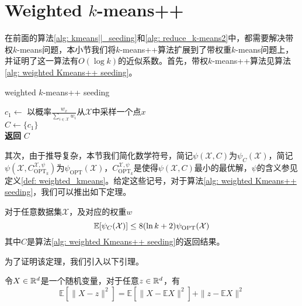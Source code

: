 \section{Weighted \texorpdfstring{$k$}{k}-means++}
在前面的算法\ref{alg: kmeans||_seeding}和\ref{alg: reduce_k-means2}中，都需要解决带权$k$-means问题，本小节我们将$k$-means++算法扩展到了带权重$k$-means问题上，并证明了这一算法有$O(\log k)$的近似系数。首先，带权$k$-means++算法见算法\ref{alg: weighted Kmeans++ seeding}。
\begin{algorithm}
    \caption{weighted $k$-means++ seeding}\label{alg: weighted Kmeans++ seeding}
    $c_1 \gets $ 以概率$\frac{w_x}{\sum_{i \in \mathcal{X}} w_i}$从$\mathcal{X}$中采样一个点$x$ \\
    $C \gets \{c_1\}$ \\
    \textbf{返回} $C$
\end{algorithm}
其次，由于推导复杂，本节我们简化数学符号，简记$\psi(\mathcal{X},C)$为$\psi_{C}(\mathcal{X})$，简记$\psi(\mathcal{X},C_{\text{OPT}_k}^{\mathcal{X},\psi})$为$\psi_{\text{OPT}}(\mathcal{X})$，$C_{\text{OPT}_k}^{\mathcal{X},\psi}$是使得$\psi(\mathcal{X},C)$最小的最优解，$\psi$的含义参见定义\ref{def: weighted_kmeans}。给定这些记号，对于算法\ref{alg: weighted Kmeans++ seeding}，我们可以推出如下定理。
\begin{theorem}
    \label{theo: weighted kmeans++}
    对于任意数据集$\mathcal{X}$，及对应的权重$w$
    \begin{equation*}
        \mathbb{E}[\psi_C(\mathcal{X})] \leq 8(\ln k + 2) \psi_\text{OPT}(\mathcal{X})
    \end{equation*}
    其中$C$是算法\ref{alg: weighted Kmeans++ seeding}的返回结果。
\end{theorem}
为了证明该定理，我们引入以下引理。
\begin{lemma}
    \label{lem: expectation}
    令$X\in \mathbb{R}^d$是一个随机变量，对于任意$z \in \mathbb{R}^d$，有
    \begin{equation}
        \label{eq: expectation1}
        \mathbb{E}[\|X-z\|^{2}]=\mathbb{E}[\|X-\mathbb{E} X\|^{2}]+\|z-\mathbb{E} X\|^{2}
    \end{equation}
\end{lemma}
